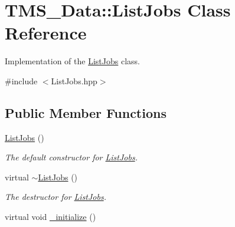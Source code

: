 \hypertarget{classTMS__Data_1_1ListJobs}{
\section{TMS\_\-Data::ListJobs Class Reference}
\label{classTMS__Data_1_1ListJobs}
}


Implementation of the \hyperlink{classTMS__Data_1_1ListJobs}{ListJobs} class.  




{\ttfamily \#include $<$ListJobs.hpp$>$}

\subsection*{Public Member Functions}
\begin{DoxyCompactItemize}
\item 
\hypertarget{classTMS__Data_1_1ListJobs_a5891f9e07f5cb4bd212cb72defb7e07d}{
\hyperlink{classTMS__Data_1_1ListJobs_a5891f9e07f5cb4bd212cb72defb7e07d}{ListJobs} ()}
\label{classTMS__Data_1_1ListJobs_a5891f9e07f5cb4bd212cb72defb7e07d}

\begin{DoxyCompactList}\small\item\em The default constructor for \hyperlink{classTMS__Data_1_1ListJobs}{ListJobs}. \item\end{DoxyCompactList}\item 
\hypertarget{classTMS__Data_1_1ListJobs_a4c537fda2dcbfd4e28b072e5cd68cd6c}{
virtual \hyperlink{classTMS__Data_1_1ListJobs_a4c537fda2dcbfd4e28b072e5cd68cd6c}{$\sim$ListJobs} ()}
\label{classTMS__Data_1_1ListJobs_a4c537fda2dcbfd4e28b072e5cd68cd6c}

\begin{DoxyCompactList}\small\item\em The destructor for \hyperlink{classTMS__Data_1_1ListJobs}{ListJobs}. \item\end{DoxyCompactList}\item 
\hypertarget{classTMS__Data_1_1ListJobs_a406e20190fadc086958d8b7832707b89}{
virtual void \hyperlink{classTMS__Data_1_1ListJobs_a406e20190fadc086958d8b7832707b89}{\_\-initialize} ()}
\label{classTMS__Data_1_1ListJobs_a406e20190fadc086958d8b7832707b89}


\end{DoxyCompactItemize}
